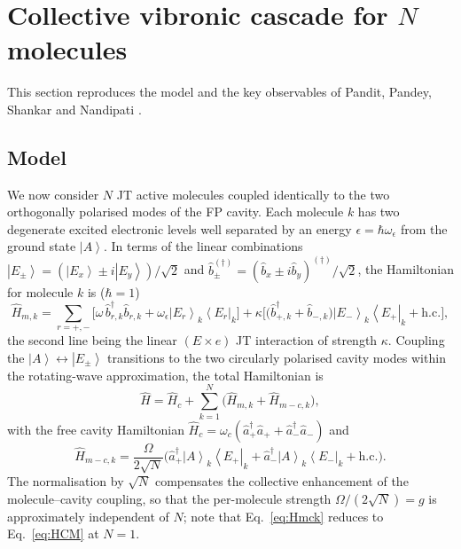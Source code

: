 \documentclass[12pt,a4paper]{article}
\newcommand{\ket}[1]{\left|#1\right\rangle}
\newcommand{\bra}[1]{\left\langle#1\right|}
\begin{document}
\section{Collective vibronic cascade for $N$ molecules}\label{sec:2mol}

This section reproduces the model and the key observables of Pandit, Pandey,
Shankar and Nandipati \cite{Pandit2025}.

\subsection{Model}

We now consider $N$ JT active molecules coupled identically to the two
orthogonally polarised modes of the FP cavity. Each molecule $k$ has two
degenerate excited electronic levels well separated by an energy
$\epsilon=\hbar\omega_\epsilon$ from the ground state $\ket{A}$. In terms of
the linear combinations $\ket{E_\pm}=(\ket{E_x}\pm i\ket{E_y})/\sqrt2$ and
$\hat b^{(\dagger)}_\pm=(\hat b_x\pm i\hat b_y)^{(\dagger)}/\sqrt2$, the
Hamiltonian for molecule $k$ is ($\hbar=1$)
\begin{equation}
  \hat H_{m,k}=\sum_{r=+,-}\Big[\omega\,\hat b^\dagger_{r,k}\hat b_{r,k}
    +\omega_\epsilon\ket{E_r}_k\bra{E_r}_k\Big]
    +\kappa\Big[\big(\hat b^\dagger_{+,k}+\hat b_{-,k}\big)
    \ket{E_-}_k\bra{E_+}_k+\mathrm{h.c.}\Big],
  \label{eq:Hmk}
\end{equation}
the second line being the linear $(E\times e)$ JT interaction of strength
$\kappa$. Coupling the $\ket{A}\leftrightarrow\ket{E_\pm}$ transitions to the
two circularly polarised cavity modes within the rotating-wave approximation,
the total Hamiltonian is
\begin{equation}
  \hat H=\hat H_c+\sum_{k=1}^{N}\big(\hat H_{m,k}+\hat H_{m-c,k}\big),
  \label{eq:Htot2}
\end{equation}
with the free cavity Hamiltonian
$\hat H_c=\omega_c(\hat a^\dagger_+\hat a_++\hat a^\dagger_-\hat a_-)$ and
\begin{equation}
  \hat H_{m-c,k}=\frac{\Omega}{2\sqrt N}
    \big(\hat a^\dagger_+\ket{A}_k\bra{E_+}_k+
         \hat a^\dagger_-\ket{A}_k\bra{E_-}_k+\mathrm{h.c.}\big).
  \label{eq:Hmck}
\end{equation}
The normalisation by $\sqrt N$ compensates the collective enhancement of the
molecule--cavity coupling, so that the per-molecule strength
$\Omega/(2\sqrt N)=g$ is approximately independent of $N$; note that
Eq.~\eqref{eq:Hmck} reduces to Eq.~\eqref{eq:HCM} at $N=1$.
\end{document}
